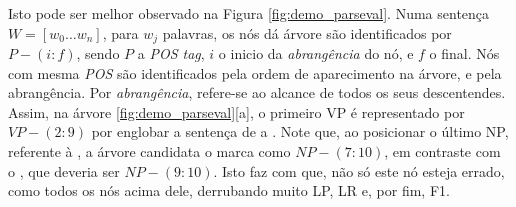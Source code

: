 Isto pode ser melhor observado na Figura \ref{fig:demo_parseval}. Numa sentença $W=[w_0 \ldots w_n]$, para $w_j$ palavras, os nós dá árvore são identificados por $P-(i:f)$, sendo $P$ a \textit{POS tag}, $i$ o inicio da \textit{abrangência} do nó, e $f$ o final. Nós com mesma \textit{POS} são identificados pela ordem de aparecimento na árvore, e pela abrangência. Por \textit{abrangência}, refere-se ao alcance de todos os seus descentendes. Assim, na árvore \ref{fig:demo_parseval}[a], o primeiro VP é representado por $VP-(2:9)$ por englobar a sentença de  a . Note que, ao posicionar o último NP, referente à , a árvore candidata o marca como $NP-(7:10)$, em contraste com o , que deveria ser $NP-(9:10)$. Isto faz com que, não só este nó esteja errado, como todos os nós acima dele, derrubando muito LP, LR e, por fim, F1.